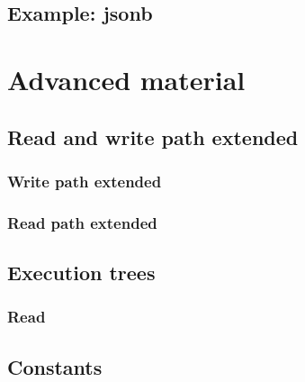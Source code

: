 \documentclass[11pt]{article}
\begin{document}
\hypertarget{example-jsonb}{%
\subsection{Example: jsonb}\label{example-jsonb}}


\newpage
\hypertarget{advanced-material}{%
\section{Advanced material}\label{advanced-material}}


\hypertarget{read-and-write-path-extended}{%
\subsection{Read and write path extended}\label{read-and-write-path-extended}}

\hypertarget{write-path-extended}{%
\subsubsection{Write path extended}\label{write-path-extended}}


\hypertarget{read-path-extended}{%
\subsubsection{Read path extended}\label{read-path-extended}}


\hypertarget{execution-trees}{%
\subsection{Execution trees}\label{execution-trees}}

\hypertarget{read}{%
\subsubsection{Read}\label{read}}


\hypertarget{constants}{%
\subsection{Constants}\label{constants}}

\end{document}
